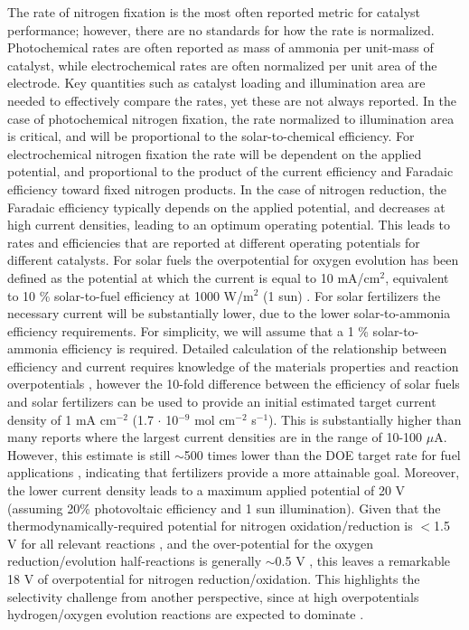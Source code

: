 The rate of nitrogen fixation is the most often reported metric for catalyst performance; however, there are no standards for how the rate is normalized. Photochemical rates are often reported as mass of ammonia per unit-mass of catalyst, while electrochemical rates are often normalized per unit area of the electrode. Key quantities such as catalyst loading and illumination area are needed to effectively compare the rates, yet these are not always reported. In the case of photochemical nitrogen fixation, the rate normalized to illumination area is critical, and will be proportional to the solar-to-chemical efficiency. For electrochemical nitrogen fixation the rate will be dependent on the applied potential, and proportional to the product of the current efficiency and Faradaic efficiency toward fixed nitrogen products. In the case of nitrogen reduction, the Faradaic efficiency typically depends on the applied potential, and decreases at high current densities, leading to an optimum operating potential. This leads to rates and efficiencies that are reported at different operating potentials for different catalysts. For solar fuels the overpotential for oxygen evolution has been defined as the potential at which the current is equal to 10 mA/cm$^2$, equivalent to 10 \% solar-to-fuel efficiency at 1000 W/m$^2$ (1 sun) \cite{McCrory_2013}. For solar fertilizers the necessary current will be substantially lower, due to the lower solar-to-ammonia efficiency requirements. 
For simplicity, we will assume that a 1 \% solar-to-ammonia efficiency is required. Detailed calculation of the relationship between efficiency and current requires knowledge of the materials properties and reaction overpotentials \cite{Weber_1984,Pinaud_2013,Seitz_2014}, however the 10-fold difference between the efficiency of solar fuels and solar fertilizers can be used to provide an initial estimated target current density of 1 mA cm$^{-2}$ (1.7 $\cdot$ 10$^{-9}$ mol cm$^{-2}$ s$^{-1}$). 
This is substantially higher than many reports where the largest current densities are in the range of 10-100 $\mu$A. However, this estimate is still $\sim$500 times lower than the DOE target rate for fuel applications \cite{McPherson_2019}, indicating that fertilizers provide a more attainable goal. Moreover, the lower current density leads to a maximum applied potential of 20 V (assuming 20\% photovoltaic efficiency and 1 sun illumination). Given that the thermodynamically-required potential for nitrogen oxidation/reduction is $<$1.5 V for all relevant reactions \cite{Medford_2017}, and the over-potential for the oxygen reduction/evolution half-reactions is generally $\sim$0.5 V \cite{McCrory_2013,McCrory_2015}, this leaves a remarkable 18 V of overpotential for nitrogen reduction/oxidation. This highlights the selectivity challenge from another perspective, since at high overpotentials hydrogen/oxygen evolution reactions are expected to dominate \cite{Skulason_2012, Singh_2017}.


